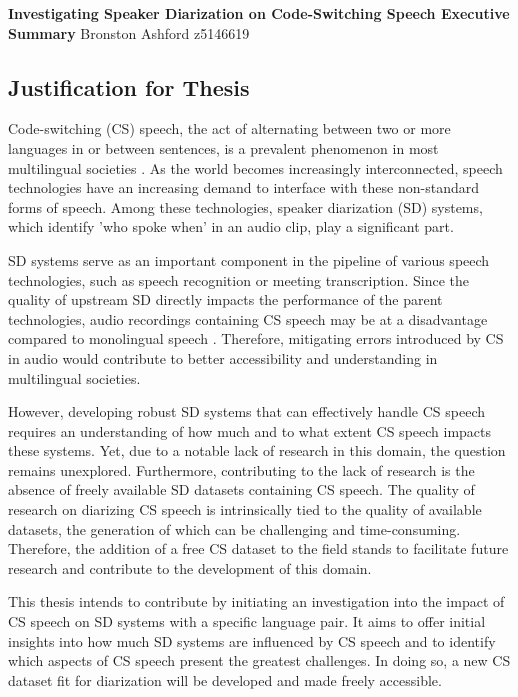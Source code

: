 \documentclass[11pt, a4paper]{report}
\begin{document}
\begin{center}
    \large\textbf{\textcolor{unswred2}{Investigating Speaker Diarization on Code-Switching 
    Speech Executive Summary}}
    {\textcolor{unswred2}{Bronston Ashford z5146619}}
  \end{center}

\subsection*{Justification for Thesis}

Code-switching (CS) speech, the act of alternating between two or more languages 
in or between sentences, is a prevalent phenomenon in  most multilingual societies 
\cite[2]{sitaramSurveyCodeswitchedSpeech2020}. 
As the world becomes increasingly interconnected, speech technologies have an 
increasing demand to interface with these non-standard forms of speech. Among these 
technologies, speaker diarization (SD) systems, which identify 'who spoke when' 
in an audio clip, play a significant part.

\vspace*{10pt}
SD systems serve as an important component in the pipeline of various speech 
technologies, such as speech recognition or meeting transcription. Since the 
quality of upstream SD directly impacts the performance of the parent technologies, 
audio recordings containing CS speech may be at a disadvantage compared to monolingual 
speech \cite[20]{parkReviewSpeakerDiarization2021}. Therefore, mitigating errors 
introduced by CS in audio would contribute to  better accessibility and understanding 
in multilingual societies.

\vspace*{10pt}
However, developing robust SD systems that can effectively handle CS speech 
requires an understanding of how much and to what extent CS speech impacts these 
systems. Yet, due to a notable lack of research in this domain, the question 
remains unexplored. Furthermore, contributing to the lack of research is the absence of freely available 
SD datasets containing CS speech. The quality of research on diarizing CS speech 
is intrinsically tied to the quality of available datasets, the generation of 
which can be challenging and time-consuming. Therefore, the addition of a free 
CS dataset to the field stands to facilitate future research and contribute to 
the development of this domain. 

\vspace*{10pt}
This thesis intends to contribute by initiating 
an investigation into the impact of CS speech on SD systems with a specific 
language pair. It aims to offer initial insights into how much SD systems are 
influenced by CS speech and to identify which aspects of CS speech present the 
greatest challenges. In doing so, a new CS dataset fit for diarization will be 
developed and made freely accessible.
\end{document}
